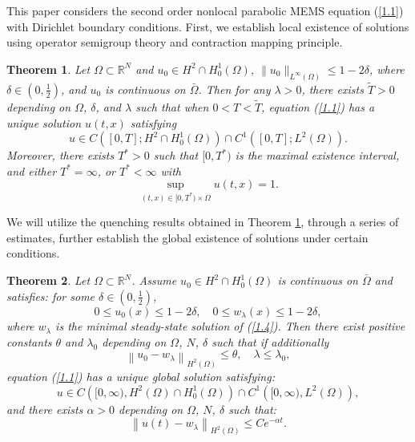 \documentclass{article}
\numberwithin{equation}{section}
\newtheorem{theorem}{Theorem}[section]
\begin{document}
\qquad This paper considers the second order nonlocal parabolic MEMS equation (\ref{1.1}) with Dirichlet boundary conditions. First, we establish local existence of solutions using operator semigroup theory and contraction mapping principle.
\begin{theorem}\label{local existence}
Let $\Omega\subset\mathbb{R}^{N}$ and $u_0 \in H^{2}\cap H_{0}^{1}(\Omega)$, $\|u_{0}\|_{L^{\infty}(\Omega)} \le 1-2 \delta$, where $\delta \in\left(0, \frac{1}{2}\right)$, and $u_0$ is continuous on $\bar{\Omega}$. Then for any $\lambda>0$, there exists $\widetilde{T}>0$ depending on $\Omega$, $\delta$, and $\lambda$ such that when $0<T< \widetilde{T}$, equation (\ref{1.1}) has a unique solution $u(t, x)$ satisfying
$$
u \in C\left([0, T]; H^{2} \cap H_{0}^{1}(\Omega)\right) \cap C^{1}\left([0, T]; L^{2}(\Omega)\right).
$$
Moreover, there exists $T^{*}>0$ such that $[0,T^{*})$ is the maximal existence interval, and either $T^{*}=\infty$, or $T^{*}<\infty$ with
$$
\sup_{(t, x) \in [0, T^{*}) \times \Omega} u(t, x)=1.
$$
\label{local soultion}
\end{theorem}

We will utilize the quenching results obtained in Theorem \ref{local existence}, through a series of estimates, further establish the global existence of solutions under certain conditions.

\begin{theorem}\label{global existence}
Let $\Omega\subset\mathbb{R}^{N}$. Assume $u_{0}\in H^{2}\cap H_{0}^{1}(\Omega)$ is continuous on $\bar{\Omega}$ and satisfies: for some $\delta \in\left(0, \frac{1}{2}\right)$,
\begin{equation}
0 \le u_{0}(x) \le 1-2 \delta ,\quad 0 \le w_{\lambda}(x) \le 1-2 \delta,\label{029}
\end{equation}
where $w_{\lambda}$ is the minimal steady-state solution of (\ref{1.4}). Then there exist positive constants $\theta$ and $\lambda_{0}$ depending on $\Omega$, $N$, $\delta$ such that if additionally
\begin{equation}
\left\|u_{0}-w_{\lambda}\right\|_{H^{2}(\Omega)} \le \theta,\quad \lambda \le \lambda_{0} , \label{030}
\end{equation}
equation (\ref{1.1}) has a unique global solution satisfying:
\begin{equation}
u \in C\left([0, \infty), H^{2}(\Omega) \cap H_{0}^{1}(\Omega)\right) \cap C^{1}\left([0, \infty), L^{2}(\Omega)\right),\label{031}
\end{equation}
and there exists $\alpha > 0$ depending on $\Omega$, $N$, $\delta$ such that:
\begin{equation}
\left\|u(t)-w_{\lambda}\right\|_{H^{2}(\Omega)} \le C e^{-\alpha t}.\label{032}
\end{equation}
\end{theorem}
\end{document}

